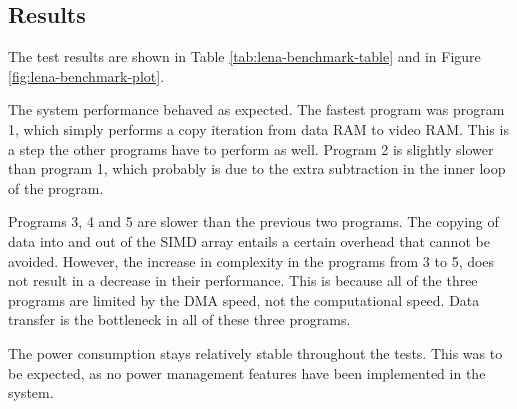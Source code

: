 \clearpage
\subsection{Results}

The test results are shown in Table \ref{tab:lena-benchmark-table} and
in Figure \ref{fig:lena-benchmark-plot}. 




The system performance behaved as expected. The fastest program was
program 1, which simply performs a copy iteration from data RAM to video
RAM. This is a step the other programs have to perform as well. Program
2 is slightly slower than program 1, which probably is due to the extra
subtraction in the inner loop of the program.

Programs 3, 4 and 5 are slower than the previous two programs. The
copying of data into and out of the SIMD array entails a certain
overhead that cannot be avoided. However, the increase in complexity in
the programs from 3 to 5, does not result in a decrease in their
performance. This is because all of the three programs are limited by
the DMA speed, not the computational speed. Data transfer is the
bottleneck in all of these three programs.

The power consumption stays relatively stable throughout the tests. This
was to be expected, as no power management features have been
implemented in the system.
